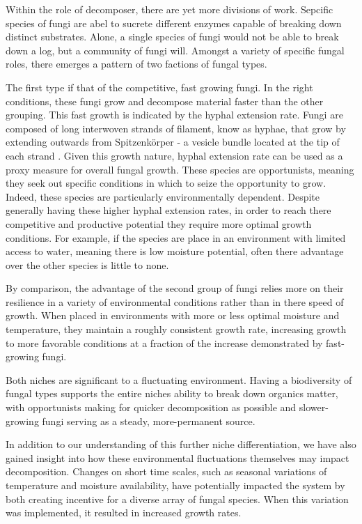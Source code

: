 \documentclass[12pt]{article}
\begin{document}
Within the role of decomposer, there are yet more divisions of work. Sepcific species of fungi are abel to sucrete different enzymes capable of breaking down distinct substrates. Alone, a single species of fungi would not be able to break down a log, but a community of fungi will. Amongst a variety of specific fungal roles, there emerges a pattern of two factions of fungal types. %

The first type if that of the competitive, fast growing fungi. In the right conditions, these fungi grow and decompose material faster than the other grouping. This fast growth is indicated by the hyphal extension rate. Fungi are composed of long interwoven strands of filament, know as hyphae, that grow by extending outwards from Spitzenkörper - a vesicle bundle located at the tip of each strand \cite{Edelstein1982}. Given this growth nature, hyphal extension rate can be used as a proxy measure for overall fungal growth. These species are opportunists, meaning they seek out specific conditions in which to seize the opportunity to grow. Indeed, these species are particularly environmentally dependent. Despite generally having these higher hyphal extension rates, in order to reach there competitive and productive potential they require more optimal growth conditions. For example, if the species are place in an environment with limited access to water, meaning there is low moisture potential, often there advantage over the other species is little to none.

By comparison, the advantage of the second group of fungi relies more on their resilience in a variety of environmental conditions rather than in there speed of growth. When placed in environments with more or less optimal moisture and temperature, they maintain a roughly consistent growth rate, increasing growth to more favorable conditions at a fraction of the increase demonstrated by fast-growing fungi.

Both niches are significant to a fluctuating environment. Having a biodiversity of fungal types supports the entire niches ability to break down organics matter, with opportunists making for quicker decomposition as possible and slower-growing fungi serving as a steady, more-permanent  source.

In addition to our understanding of this further niche differentiation, we have also gained insight into how these environmental fluctuations themselves may impact decomposition. Changes on short time scales, such as seasonal variations of temperature and moisture availability, have potentially impacted the system by both creating incentive for a diverse array of fungal species. When this variation was implemented, it resulted in increased growth rates.
\end{document}
